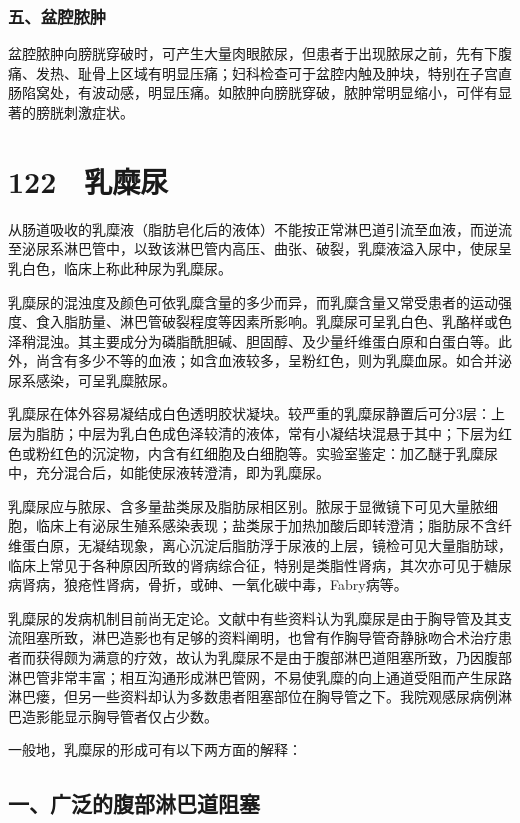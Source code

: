 \subsubsection{五、盆腔脓肿}

盆腔脓肿向膀胱穿破时，可产生大量肉眼脓尿，但患者于出现脓尿之前，先有下腹痛、发热、耻骨上区域有明显压痛；妇科检查可于盆腔内触及肿块，特别在子宫直肠陷窝处，有波动感，明显压痛。如脓肿向膀胱穿破，脓肿常明显缩小，可伴有显著的膀胱刺激症状。

\protect\hypertarget{text00286.html}{}{}

\section{122　乳糜尿}

从肠道吸收的乳糜液（脂肪皂化后的液体）不能按正常淋巴道引流至血液，而逆流至泌尿系淋巴管中，以致该淋巴管内高压、曲张、破裂，乳糜液溢入尿中，使尿呈乳白色，临床上称此种尿为乳糜尿。

乳糜尿的混浊度及颜色可依乳糜含量的多少而异，而乳糜含量又常受患者的运动强度、食入脂肪量、淋巴管破裂程度等因素所影响。乳糜尿可呈乳白色、乳酪样或色泽稍混浊。其主要成分为磷脂酰胆碱、胆固醇、及少量纤维蛋白原和白蛋白等。此外，尚含有多少不等的血液；如含血液较多，呈粉红色，则为乳糜血尿。如合并泌尿系感染，可呈乳糜脓尿。

乳糜尿在体外容易凝结成白色透明胶状凝块。较严重的乳糜尿静置后可分3层：上层为脂肪；中层为乳白色成色泽较清的液体，常有小凝结块混悬于其中；下层为红色或粉红色的沉淀物，内含有红细胞及白细胞等。实验室鉴定：加乙醚于乳糜尿中，充分混合后，如能使尿液转澄清，即为乳糜尿。

乳糜尿应与脓尿、含多量盐类尿及脂肪尿相区别。脓尿于显微镜下可见大量脓细胞，临床上有泌尿生殖系感染表现；盐类尿于加热加酸后即转澄清；脂肪尿不含纤维蛋白原，无凝结现象，离心沉淀后脂肪浮于尿液的上层，镜检可见大量脂肪球，临床上常见于各种原因所致的肾病综合征，特别是类脂性肾病，其次亦可见于糖尿病肾病，狼疮性肾病，骨折，或砷、一氧化碳中毒，Fabry病等。

乳糜尿的发病机制目前尚无定论。文献中有些资料认为乳糜尿是由于胸导管及其支流阻塞所致，淋巴造影也有足够的资料阐明，也曾有作胸导管奇静脉吻合术治疗患者而获得颇为满意的疗效，故认为乳糜尿不是由于腹部淋巴道阻塞所致，乃因腹部淋巴管非常丰富；相互沟通形成淋巴管网，不易使乳糜的向上通道受阻而产生尿路淋巴瘘，但另一些资料却认为多数患者阻塞部位在胸导管之下。我院观感尿病例淋巴造影能显示胸导管者仅占少数。

一般地，乳糜尿的形成可有以下两方面的解释：

\subsection{一、广泛的腹部淋巴道阻塞}


